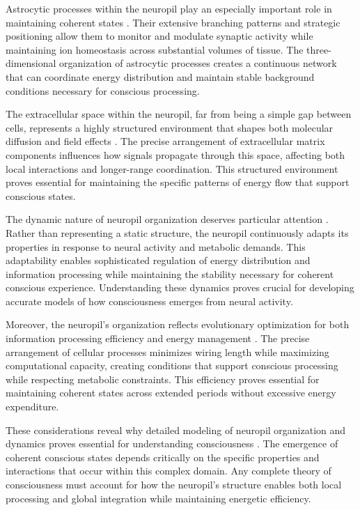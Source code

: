 Astrocytic processes within the neuropil play an especially important role in maintaining coherent states \cite{Ventura1999}. Their extensive branching patterns and strategic positioning allow them to monitor and modulate synaptic activity while maintaining ion homeostasis across substantial volumes of tissue. The three-dimensional organization of astrocytic processes creates a continuous network that can coordinate energy distribution and maintain stable background conditions necessary for conscious processing.

The extracellular space within the neuropil, far from being a simple gap between cells, represents a highly structured environment that shapes both molecular diffusion and field effects \cite{Savtchenko2014}. The precise arrangement of extracellular matrix components influences how signals propagate through this space, affecting both local interactions and longer-range coordination. This structured environment proves essential for maintaining the specific patterns of energy flow that support conscious states.

The dynamic nature of neuropil organization deserves particular attention \cite{Sorra2000}. Rather than representing a static structure, the neuropil continuously adapts its properties in response to neural activity and metabolic demands. This adaptability enables sophisticated regulation of energy distribution and information processing while maintaining the stability necessary for coherent conscious experience. Understanding these dynamics proves crucial for developing accurate models of how consciousness emerges from neural activity.

Moreover, the neuropil's organization reflects evolutionary optimization for both information processing efficiency and energy management \cite{Peters1991}. The precise arrangement of cellular processes minimizes wiring length while maximizing computational capacity, creating conditions that support conscious processing while respecting metabolic constraints. This efficiency proves essential for maintaining coherent states across extended periods without excessive energy expenditure.

These considerations reveal why detailed modeling of neuropil organization and dynamics proves essential for understanding consciousness \cite{Mishchenko2010}. The emergence of coherent conscious states depends critically on the specific properties and interactions that occur within this complex domain. Any complete theory of consciousness must account for how the neuropil's structure enables both local processing and global integration while maintaining energetic efficiency.


